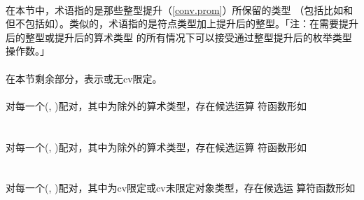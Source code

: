 \paragraph{}
在本节中，术语指的是那些整型提升（\ref{conv.prom}）所保留的类型
（包括比如和但不包括如）。类似的，术语指的是符点类型加上提升后的整型。「注：在需要提升后的整型或提升后的算术类型
的所有情况下可以接受通过整型提升后的枚举类型操作数。」

\paragraph{}
在本节剩余部分，表示或无cv限定。

\paragraph{}
对每一个(, )配对，其中为除外的算术类型，存在候选运算
符函数形如                                                                    \\
\mbox{}                 \\
\mbox{}

\paragraph{}
对每一个(, )配对，其中为除外的算术类型，存在候选运算
符函数形如                                                                    \\
\mbox{}               \\
\mbox{}

\paragraph{}
对每一个(, )配对，其中为cv限定或cv未限定对象类型，存在候选运
算符函数形如                                                                  \\
\mbox{}                                  \\
\mbox{}                                \\
\mbox{}      \\
\mbox{}

